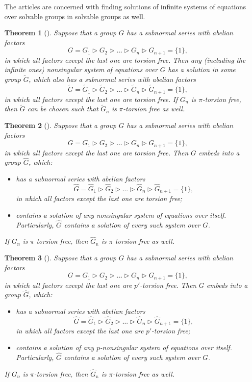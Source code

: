 \documentclass{article}
\newtheorem*{theorem*}{Theorem}
\theoremstyle{definition}
\theoremstyle{remark}
\let\tilde\widetilde
\let\hat\widehat
\begin{document}
The articles \cite{KMR24,M24} are concerned with
finding solutions of infinite systems of equations
over solvable groups in solvable groups as well.
\begin{theorem*}[\!\!\cite{KMR24}]
Suppose that a group $G$
has a subnormal series with abelian factors
$$
G=G_1 \triangleright G_2 \triangleright  \ldots \triangleright G_n \triangleright G_{n+1} =\{1\},
$$
in which all factors except the last one are torsion free.
Then any (including the infinite ones)
nonsingular system of equations over $G$
has a solution in some group $\tilde G$, which also
has a subnormal series with abelian factors
$$
\tilde G= \tilde G_1\triangleright  \tilde G_2
\triangleright \ldots \triangleright  \tilde G_{n}
\triangleright  \tilde G_{n+1}=\{1\},
$$
in which all factors except the last one are torsion free.
If $G_n$ is $\pi$-torsion free, then
$\tilde G$ can be chosen such that $\tilde G_n$
is $\pi$-torsion free as well.
\end{theorem*}
\begin{theorem*}[\!\!\cite{M24}]
Suppose that a group $G$
has a subnormal series with abelian factors
$$
G=G_1 \triangleright G_2 \triangleright  \ldots \triangleright G_n \triangleright G_{n+1} =\{1\},
$$
in which all factors except the last one are torsion free.
Then $G$ embeds into a group $\hat G$, which:
\begin{itemize}
\item has a subnormal series with abelian factors
$$
\hat G= \hat G_1\triangleright  \hat G_2
\triangleright \ldots \triangleright  \hat G_{n}
\triangleright  \hat G_{n+1}=\{1\},
$$
in which all factors except the last one are torsion free;
\item contains a solution of any nonsingular
system of equations over itself. Particularly,
$\hat G$ contains a solution of every such system
over $G$.
\end{itemize}
If $G_n$ is $\pi$-torsion free, then
$\hat G_n$ is $\pi$-torsion free as well.
\end{theorem*}
\begin{theorem*}[\!\!\cite{M24}]
Suppose that a group $G$
has a subnormal series with abelian factors
$$
G=G_1 \triangleright G_2 \triangleright  \ldots \triangleright G_n \triangleright G_{n+1} =\{1\},
$$
in which all factors except the last one are $p'$-torsion free.
Then $G$ embeds into a group $\hat G$, which:
\begin{itemize}
\item has a subnormal series with abelian factors
$$
\hat G= \hat G_1\triangleright  \hat G_2
\triangleright \ldots \triangleright  \hat G_{n}
\triangleright  \hat G_{n+1}=\{1\},
$$
in which all factors except the last one are $p'$-torsion free;
\item contains a solution of any $p$-nonsingular
system of equations over itself. Particularly,
$\hat G$ contains a solution of every such system
over $G$.
\end{itemize}
If $G_n$ is $\pi$-torsion free, then
$\hat G_n$ is $\pi$-torsion free as well.
\end{theorem*}
\end{document}
